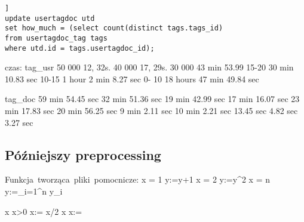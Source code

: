 \documentclass[11pt,a4paper]{report}
\begin{document}
\begin{lstlisting}[frame=lines, caption={Skrypt updatujący pole how\_much w tabeli usertagdoc}, label={sql_usrtagdoc}] ]
update usertagdoc utd
set how_much = (select count(distinct tags.tags_id)
from usertagdoc_tag tags
where utd.id = tags.usertagdoc_id);
\end{lstlisting}




czas:
tag\_usr
50 000 12, 32s.
40 000 17, 29s.
30 000 43 min 53.99
15-20  30 min 10.83 sec
10-15  1 hour 2 min 8.27 sec
0- 10  18 hours 47 min 49.84 sec

tag\_doc
59 min 54.45 sec
32 min 51.36 sec
19 min 42.99 sec
17 min 16.07 sec
23 min 17.83 sec
20 min 56.25 sec
9 min 2.11 sec
10 min 2.21 sec
13.45 sec
4.82 sec
3.27 sec

\subsection{Późniejszy preprocessing}


\begin{program}
\mbox{Funkcja tworząca pliki pomocnicze:}
\IF x = 1 \AR y:=y+1
\BAR x = 2 \AR y:=y^2
\utdots
\BAR x = n \AR y:=\displaystyle\sum_{i=1}^n y_i \FI
 
 \origbar x \AND x>0 \AR x:= x/2
\BAR {} \origbar x    \AR x:=  \OD
\end{program}
\end{document}
